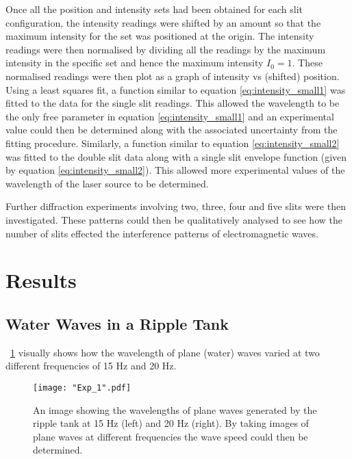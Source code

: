 \documentclass{article}
\newcommand{\figref}[2][\figurename~]{#1\ref{#2}}
\begin{document}
\vspace{2mm}
\noindent
Once all the position and intensity sets had been obtained for each slit configuration, the intensity readings were shifted by an amount so that the maximum intensity for the set was positioned at the origin. The intensity readings were then normalised by dividing all the readings by the maximum intensity in the specific set and hence the maximum intensity $I_0 = 1$. These normalised readings were then plot as a graph of intensity vs (shifted) position. Using a least squares fit, a function similar to equation \eqref{eq:intensity_small1} was fitted to the data for the single slit readings. This allowed the wavelength to be the only free parameter in equation \eqref{eq:intensity_small1} and an experimental value could then be determined along with the associated uncertainty from the fitting procedure. Similarly, a function similar to equation \eqref{eq:intensity_small2} was fitted to the double slit data along with a single slit envelope function (given by equation \eqref{eq:intensity_small2}). This allowed more experimental values of the wavelength of the laser source to be determined.

\vspace{2mm}
\noindent
Further diffraction experiments involving two, three, four and five slits were then investigated. These patterns could then be qualitatively analysed to see how the number of slits effected the interference patterns of electromagnetic waves.

\newpage
\section{Results}
\label{sec:results}

\subsection{Water Waves in a Ripple Tank}
\label{ssec:ripple-results}

\figref{fig:wavelength_image} visually shows how the wavelength of plane (water) waves varied at two different frequencies of 15 Hz and 20 Hz.

\begin{figure}[h]
\centering
\texttt{[image: "Exp\_1".pdf]}
\caption{An image showing the wavelengths of plane waves generated by the ripple tank at 15 Hz (left) and 20 Hz (right). By taking images of plane waves at different frequencies the wave speed could then be determined.}
\label{fig:wavelength_image}
\end{figure}
\end{document}
